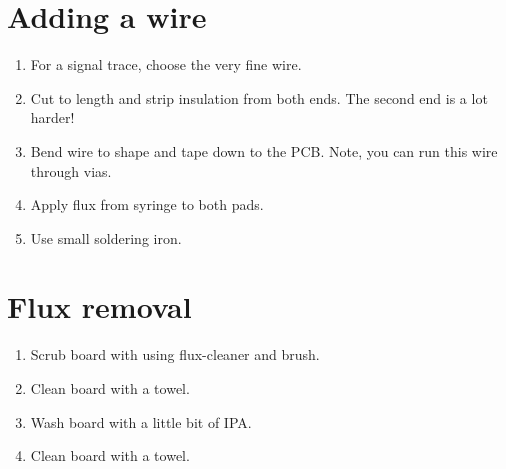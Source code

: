\section{Adding a wire}

\begin{enumerate}
\item For a signal trace, choose the very fine wire.

\item Cut to length and strip insulation from both ends.  The second
  end is a lot harder!

\item Bend wire to shape and tape down to the PCB.  Note, you can run
  this wire through vias.

\item Apply flux from syringe to both pads.

\item Use small soldering iron.  
\end{enumerate}


\section{Flux removal}

\begin{enumerate}
\item Scrub board with using flux-cleaner and brush.
\item Clean board with a towel.
\item Wash board with a little bit of IPA.
\item Clean board with a towel.  
\end{enumerate}
